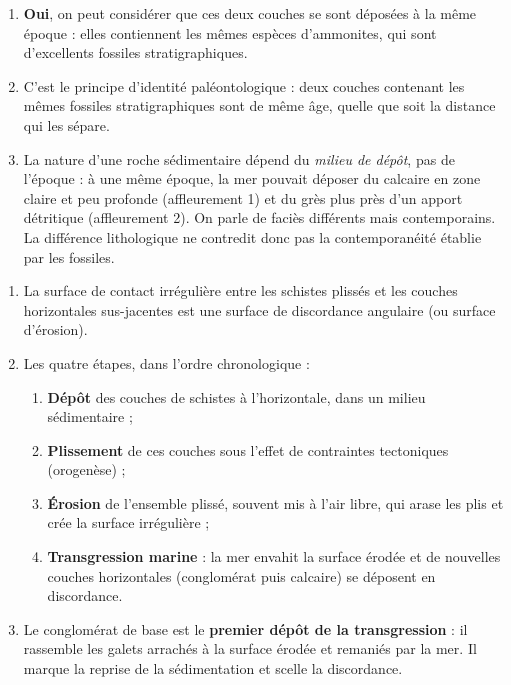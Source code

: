 \documentclass[11pt]{article}
\newcommand{\cle}[1]{{\popxbold\color{popdark}#1}}
\begin{document}
\begin{corrige}

\begin{enumerate}
\item \textbf{Oui}, on peut considérer que ces deux couches se sont déposées à la même époque : elles contiennent les mêmes espèces d'ammonites, qui sont d'excellents fossiles stratigraphiques.
\item C'est le \cle{principe d'identité paléontologique} : deux couches contenant les mêmes fossiles stratigraphiques sont de même âge, quelle que soit la distance qui les sépare.
\item La nature d'une roche sédimentaire dépend du \emph{milieu de dépôt}, pas de l'époque : à une même époque, la mer pouvait déposer du calcaire en zone claire et peu profonde (affleurement 1) et du grès plus près d'un apport détritique (affleurement 2). On parle de \cle{faciès} différents mais contemporains. La différence lithologique ne contredit donc pas la contemporanéité établie par les fossiles.
\end{enumerate}
\end{corrige}

\begin{corrige}

\begin{enumerate}
\item La surface de contact irrégulière entre les schistes plissés et les couches horizontales sus-jacentes est une \cle{surface de discordance angulaire} (ou surface d'érosion).
\item Les quatre étapes, dans l'ordre chronologique :
\begin{enumerate}
\item \textbf{Dépôt} des couches de schistes à l'horizontale, dans un milieu sédimentaire ;
\item \textbf{Plissement} de ces couches sous l'effet de contraintes tectoniques (orogenèse) ;
\item \textbf{Érosion} de l'ensemble plissé, souvent mis à l'air libre, qui arase les plis et crée la surface irrégulière ;
\item \textbf{Transgression marine} : la mer envahit la surface érodée et de nouvelles couches horizontales (conglomérat puis calcaire) se déposent en discordance.
\end{enumerate}
\item Le conglomérat de base est le \textbf{premier dépôt de la transgression} : il rassemble les galets arrachés à la surface érodée et remaniés par la mer. Il marque la reprise de la sédimentation et scelle la discordance.
\end{enumerate}
\end{corrige}
\end{document}
